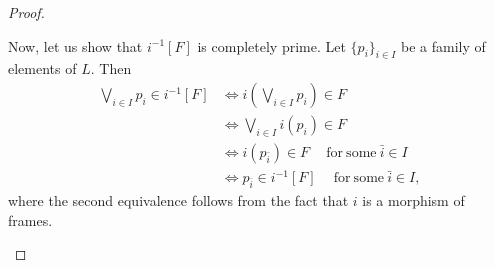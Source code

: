 \documentclass{article}
\newcommand{\corn}[1]{(\mathsf{W}(#1),\tau_{#1})}
\theoremstyle{plain}
\newtheorem{corollary}[theorem]{Corollary}
\theoremstyle{definition}
\theoremstyle{remark}
\newcommand{\bool}[1]{\mathsf{#1}}
\newcommand{\0}{\mathbbm 0}
\newcommand{\1}{\mathbbm 1}
\newcommand{\2}{\mathbbm 2}
\begin{document}
\begin{proof}
\begin{description}[font=\normalfont\itshape]

        Now, let us show that \(i^{-1}[F]\) is completely prime. Let \(\{p_i\}_{i \in I}\) be a family of elements of \(L\). Then \begin{align*}
            \bigvee_{i \in I} p_i \in i^{-1}[F]  &\iff i(  \bigvee_{i \in I} p_i) \in F\\
            &\iff  \bigvee_{i \in I} i(p_i) \in F\\
            &\iff i(p_{\bar{i}}) \in F \quad \mathrm{\ for \ some \ }\bar{i} \in I\\
             &\iff p_{\bar{i}} \in i^{-1}[F]  \quad \mathrm{\ for \ some \ }\bar{i} \in I,
        \end{align*}
        where the second equivalence follows from the fact that \(i\) is a morphism of frames.
        \end{description}
\end{proof}






\end{document}
